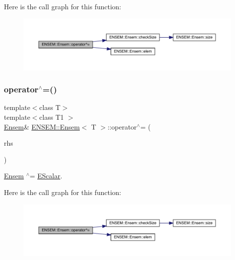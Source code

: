 Here is the call graph for this function\+:
\nopagebreak
\begin{figure}[H]
\begin{center}
\leavevmode
\includegraphics[width=350pt]{d7/d3e/classENSEM_1_1Ensem_a7f9a469a80ccb509892aef8d356fd81e_cgraph}
\end{center}
\end{figure}
\mbox{\label{classENSEM_1_1Ensem_a7f9a469a80ccb509892aef8d356fd81e}} 
\subsubsection{\texorpdfstring{operator$^\wedge$=()}{operator^=()}\hspace{0.1cm}{\footnotesize\ttfamily [2/2]}}
{\footnotesize\ttfamily template$<$class T$>$ \\
template$<$class T1 $>$ \\
\mbox{\hyperlink{classENSEM_1_1Ensem}{Ensem}}\& \mbox{\hyperlink{classENSEM_1_1Ensem}{E\+N\+S\+E\+M\+::\+Ensem}}$<$ T $>$\+::operator$^\wedge$= (\begin{DoxyParamCaption}\item[{const \mbox{\hyperlink{classENSEM_1_1EScalar}{E\+Scalar}}$<$ T1 $>$ \&}]{rhs }\end{DoxyParamCaption})\hspace{0.3cm}{\ttfamily [inline]}}



\mbox{\hyperlink{classENSEM_1_1Ensem}{Ensem}} $^\wedge$= \mbox{\hyperlink{classENSEM_1_1EScalar}{E\+Scalar}}. 

Here is the call graph for this function\+:
\nopagebreak
\begin{figure}[H]
\begin{center}
\leavevmode
\includegraphics[width=350pt]{d7/d3e/classENSEM_1_1Ensem_a7f9a469a80ccb509892aef8d356fd81e_cgraph}
\end{center}
\end{figure}
\mbox{\label{classENSEM_1_1Ensem_aa0c3f80e393be46c6f0a1cb3bbdfb170}} 
